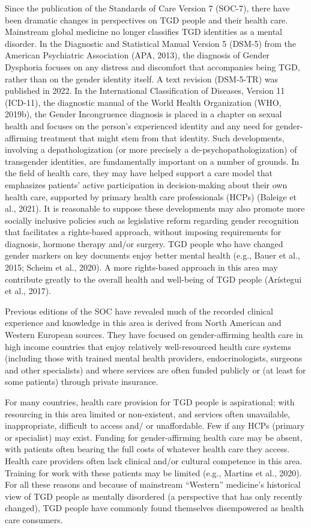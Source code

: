 \documentclass[
]{book}
\begin{document}
Since the publication of the Standards of Care
Version 7 (SOC-7), there have been dramatic
changes in perspectives on TGD people and their
health care. Mainstream global medicine no longer classifies TGD identities as a mental disorder.
In the Diagnostic and Statistical Manual Version
5 (DSM-5) from the American Psychiatric
Association (APA, 2013), the diagnosis of Gender
Dysphoria focuses on any distress and discomfort
that accompanies being TGD, rather than on the
gender identity itself. A text revision (DSM-5-TR)
was published in 2022. In the International
Classification of Diseases, Version 11 (ICD-11),
the diagnostic manual of the World Health
Organization (WHO, 2019b), the Gender
Incongruence diagnosis is placed in a chapter on
sexual health and focuses on the person's experienced identity and any need for gender-affirming
treatment that might stem from that identity.
Such developments, involving a depathologization
(or more precisely a de-psychopathologization)
of transgender identities, are fundamentally
important on a number of grounds. In the field
of health care, they may have helped support a
care model that emphasizes patients' active participation in decision-making about their own
health care, supported by primary health care
professionals (HCPs) (Baleige et al., 2021). It is
reasonable to suppose these developments may
also promote more socially inclusive policies such
as legislative reform regarding gender recognition
that facilitates a rights-based approach, without
imposing requirements for diagnosis, hormone
therapy and/or surgery. TGD people who have
changed gender markers on key documents enjoy
better mental health (e.g., Bauer et al., 2015;
Scheim et al., 2020). A more rights-based
approach in this area may contribute greatly to
the overall health and well-being of TGD people
(Arístegui et al., 2017).

Previous editions of the SOC have revealed
much of the recorded clinical experience and
knowledge in this area is derived from North
American and Western European sources. They
have focused on gender-affirming health care in
high income countries that enjoy relatively
well-resourced health care systems (including
those with trained mental health providers,
endocrinologists, surgeons and other specialists)
and where services are often funded publicly or
(at least for some patients) through private
insurance.

For many countries, health care provision for
TGD people is aspirational; with resourcing in this
area limited or non-existent, and services often
unavailable, inappropriate, difficult to access and/
or unaffordable. Few if any HCPs (primary or
specialist) may exist. Funding for gender-affirming
health care may be absent, with patients often
bearing the full costs of whatever health care they
access. Health care providers often lack clinical
and/or cultural competence in this area. Training
for work with these patients may be limited (e.g.,
Martins et al., 2020). For all these reasons and
because of mainstream ``Western'' medicine's historical view of TGD people as mentally disordered
(a perspective that has only recently changed),
TGD people have commonly found themselves
disempowered as health care consumers.
\end{document}
